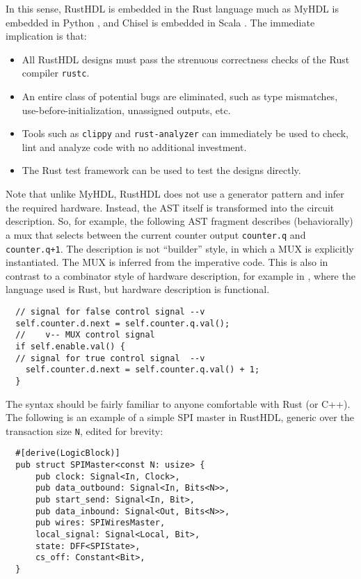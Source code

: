 \documentclass[sigplan,screen,sigconf]{acmart}
\begin{document}
In this sense, RustHDL is embedded in the Rust language much as MyHDL is embedded in Python \cite{b3},
and Chisel is embedded in Scala \cite{b2}.  The immediate implication is that:
\begin{itemize}
  \item All RustHDL designs must pass the strenuous correctness checks of the Rust compiler \verb|rustc|.
  \item An entire class of potential bugs are eliminated, such as type mismatches, use-before-initialization,
  unassigned outputs, etc.
  \item Tools such as \verb|clippy| and \verb|rust-analyzer| can immediately be used to
  check, lint and analyze code with no additional investment.
  \item The Rust test framework can be used to test the designs directly.
\end{itemize}
Note that unlike MyHDL, RustHDL does not use a generator pattern and infer the required hardware.  Instead, the AST itself is transformed into the circuit description.  So, for example, the following AST fragment describes (behaviorally) a mux that selects between the current counter output \verb|counter.q| and \verb|counter.q+1|.  The description is not ``builder'' style, in which a MUX is explicitly instantiated.  The MUX is inferred from the imperative code.  This is also in contrast to a combinator style of hardware description, for example in \cite{b4b}, where the language used is Rust, but hardware description is functional.

\begin{verbatim}
  // signal for false control signal --v
  self.counter.d.next = self.counter.q.val();
  //    v-- MUX control signal
  if self.enable.val() {
  // signal for true control signal  --v
    self.counter.d.next = self.counter.q.val() + 1;
  }
\end{verbatim}

The syntax should be fairly familiar to anyone comfortable with Rust (or C++).  The following is an example of a simple SPI master in RustHDL, generic over the transaction size \verb|N|, edited for brevity:

\begin{verbatim}
  #[derive(LogicBlock)]
  pub struct SPIMaster<const N: usize> {
      pub clock: Signal<In, Clock>,
      pub data_outbound: Signal<In, Bits<N>>,
      pub start_send: Signal<In, Bit>,
      pub data_inbound: Signal<Out, Bits<N>>,
      pub wires: SPIWiresMaster,
      local_signal: Signal<Local, Bit>,
      state: DFF<SPIState>,
      cs_off: Constant<Bit>,
  }
\end{verbatim}  
\end{document}
